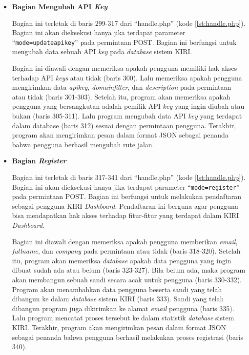 \documentclass[a4paper,twoside]{article}
\begin{document}
\begin{enumerate}
\begin{itemize}
\item \textbf{Bagian Mengubah API \textit{Key}}

Bagian ini terletak di baris 299-317 dari ``handle.php'' (kode \ref{lst:handle.php}). Bagian ini akan dieksekusi hanya jika terdapat parameter ``\texttt{mode=updateapikey}'' pada permintaan POST. Bagian ini berfungsi untuk mengubah data sebuah API \textit{key} pada \textit{database} sistem KIRI.

Bagian ini diawali dengan memeriksa apakah pengguna memiliki hak akses terhadap API \textit{keys} atau tidak (baris 300). Lalu memeriksa apakah pengguna mengirimkan data \textit{apikey}, \textit{domainfilter}, dan \textit{description} pada permintaan atau tidak (baris 301-303). Setelah itu, program akan memeriksa apakah pengguna yang bersangkutan adalah pemilik API \textit{key} yang ingin diubah atau bukan (baris 305-311). Lalu program mengubah data API \textit{key} yang terdapat dalam database (baris 312) sesuai dengan permintaan pengguna. Terakhir, program akan mengirimkan pesan dalam format JSON sebagai penanda bahwa pengguna berhasil mengubah rute jalan.

\item \textbf{Bagian \textit{Register}}

Bagian ini terletak di baris 317-341 dari ``handle.php'' (kode \ref{lst:handle.php}). Bagian ini akan dieksekusi hanya jika terdapat parameter ``\texttt{mode=register}'' pada permintaan POST. Bagian ini berfungsi untuk melakukan pendaftaran sebagai pengguna KIRI \textit{Dashboard}. Pendaftaran ini berguna agar pengguna bisa mendapatkan hak akses terhadap fitur-fitur yang terdapat dalam KIRI \textit{Dashboard}.

Bagian ini diawali dengan memeriksa apakah pengguna memberikan \textit{email}, \textit{fullname}, dan \textit{company} pada permintaan atau tidak (baris 318-320). Setelah itu, program akan memeriksa \textit{database} apakah data pengguna yang ingin dibuat sudah ada atau belum (baris 323-327). Bila belum ada, maka program akan membangun sebuah sandi secara acak untuk pengguna (baris 330-332). Program akan menambahkan data pengguna beserta sandi yang telah dibangun ke dalam \textit{database} sistem KIRI (baris 333). Sandi yang telah dibangun program juga dikirimkan ke alamat \textit{email} pengguna (baris 335). Lalu program mencatat proses tersebut ke dalam statistik \textit{database} sistem KIRI. Terakhir, program akan mengirimkan pesan dalam format JSON sebagai penanda bahwa pengguna berhasil melakukan proses registrasi (baris 340).


\end{itemize}
\end{enumerate}
\end{document}
